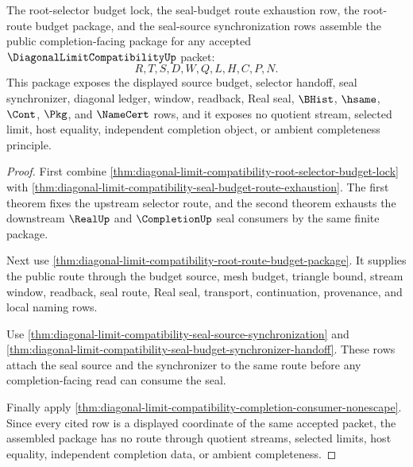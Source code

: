 \begin{theorem}
\label{thm:diagonal-limit-compatibility-completion-consumer-package}
The root-selector budget lock, the seal-budget route exhaustion row, the root-route budget package, and the seal-source synchronization rows assemble the public completion-facing package for any accepted $\DiagonalLimitCompatibilityUp$ packet:
$$
R,T,S,D,W,Q,L,H,C,P,N .
$$
This package exposes the displayed source budget, selector handoff, seal synchronizer, diagonal ledger, window, readback, Real seal, $\BHist$, $\hsame$, $\Cont$, $\Pkg$, and $\NameCert$ rows, and it exposes no quotient stream, selected limit, host equality, independent completion object, or ambient completeness principle.
\end{theorem}
\begin{proof}
First combine \autoref{thm:diagonal-limit-compatibility-root-selector-budget-lock} with \autoref{thm:diagonal-limit-compatibility-seal-budget-route-exhaustion}. The first theorem fixes the upstream selector route, and the second theorem exhausts the downstream $\RealUp$ and $\CompletionUp$ seal consumers by the same finite package.

Next use \autoref{thm:diagonal-limit-compatibility-root-route-budget-package}. It supplies the public route through the budget source, mesh budget, triangle bound, stream window, readback, seal route, Real seal, transport, continuation, provenance, and local naming rows.

Use \autoref{thm:diagonal-limit-compatibility-seal-source-synchronization} and \autoref{thm:diagonal-limit-compatibility-seal-budget-synchronizer-handoff}. These rows attach the seal source and the synchronizer to the same route before any completion-facing read can consume the seal.

Finally apply \autoref{thm:diagonal-limit-compatibility-completion-consumer-nonescape}. Since every cited row is a displayed coordinate of the same accepted packet, the assembled package has no route through quotient streams, selected limits, host equality, independent completion data, or ambient completeness.
\end{proof}

